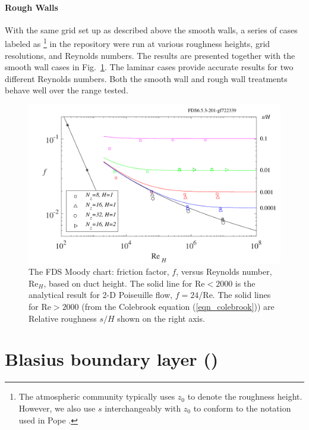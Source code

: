 \documentclass[11pt]{book}
\begin{document}
\paragraph{Rough Walls}

With the same grid set up as described above the smooth walls, a series of cases labeled as \footnote{The atmospheric community typically uses $z_0$ to denote the roughness height. However, we also use $s$ interchangeably with $z_0$ to conform to the notation used in Pope \cite{Pope:2000}.} in the repository \cite{FDS-SMV_repository} were run at various roughness heights, grid resolutions, and Reynolds numbers. The results are presented together with the smooth wall cases in Fig.~\ref{fig_fds_moody_chart}. The laminar cases provide accurate results for two different Reynolds numbers. Both the smooth wall and rough wall treatments behave well over the range tested.

\begin{figure}[ht]
\centering
\includegraphics[width=4.5in]{SCRIPT_FIGURES/fds_moody_chart}
\caption[FDS Moody chart]{The FDS Moody chart: friction factor, $f$, versus Reynolds number, Re$_H$, based on duct height. The solid line for $\mbox{Re} < 2000$ is the analytical result for 2-D Poiseuille flow, $f=24/\mbox{Re}$. The solid lines for $\mbox{Re}>2000$ (from the Colebrook equation (\ref{eqn_colebrook})) are Relative roughness $s/H$ shown on the right axis.}
\label{fig_fds_moody_chart}
\end{figure}



\section{Blasius boundary layer (\texorpdfstring{}{blasius})}
\label{sec:blasius}
\end{document}
